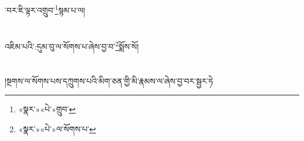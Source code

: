 ་བར་ཇི་ལྟར་འགྲུབ་\footnote{«སྣར་»«པེ་»གྲུབ་}སྙམ་པ་ལ།\chapter{ }འཇིམ་པའི་:དུམ་བུ་ལ་སོགས་པ་ཞེས་བྱ་བ་\footnote{«སྣར་»«པེ་»ལ་སོགས་པ་}སྨོས་སོ།\chapter{ }།སྔགས་ལ་སོགས་པས་དཀྲུགས་པའི་མིག་ཅན་གྱི་མི་རྣམས་ལ་ཞེས་བྱ་བར་སྦྱར་ཏེ།\c